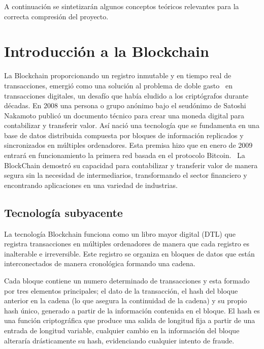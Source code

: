 
A continuación se sintetizarán algunos conceptos teóricos relevantes para la correcta compresión del proyecto.



\section{Introducción a la Blockchain}

La Blockchain proporcionando un registro inmutable y en tiempo real de transacciones, emergió como una solución al problema de doble gasto~\cite{dobleGasto} en transacciones digitales, un desafío que había eludido a los criptógrafos durante décadas.
En 2008 una persona o grupo anónimo bajo el seudónimo de Satoshi Nakamoto publicó un documento técnico para crear una moneda digital para contabilizar y transferir valor. Así nació una tecnología que se fundamenta en una base de datos distribuida compuesta por bloques de información replicados y sincronizados en múltiples ordenadores.  
Esta premisa hizo que en enero de 2009 entrará en funcionamiento la primera red basada en el protocolo Bitcoin.~\cite{introducciónBitcoin}
La BlockChain demostró su capacidad para contabilizar y transferir valor de manera segura sin la necesidad de intermediarios, transformando el sector financiero y encontrando aplicaciones en una variedad de industrias.


\subsection{Tecnología subyacente}

La tecnología Blockchain funciona como un libro mayor digital (DTL) que registra transacciones en múltiples ordenadores de manera que cada registro es inalterable e irreversible. Este registro se organiza en bloques de datos que están interconectados de manera cronológica formando una cadena. ~\cite{wiki:DTL}

Cada bloque contiene un numero determinado de transacciones y esta formado por tres elementos principales; el dato de la transacción, el hash del bloque anterior en la cadena (lo que asegura la continuidad de la cadena) y su propio hash único, generado a partir de la información contenida en el bloque.
El hash es una función criptográfica que produce una salida de longitud fija a partir de una entrada de longitud variable, cualquier cambio en la información del bloque alteraría drásticamente su hash, evidenciando cualquier intento de fraude. ~\cite{BlockchainFuncionamiento}

